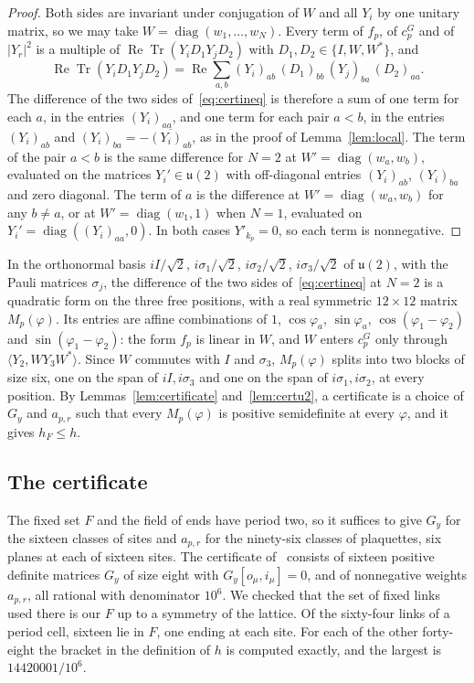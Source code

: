 \documentclass[aps,prd,twocolumn,superscriptaddress,nofootinbib,longbibliography,floatfix,amsmath,amssymb,10pt]{revtex4-2}
\theoremstyle{definition}
\theoremstyle{remark}
\newcommand{\ReTr}{\operatorname{Re}\operatorname{Tr}}
\newcommand{\ip}[2]{\langle #1,#2\rangle}
\begin{document}
\begin{proof}
Both sides are invariant under conjugation of $W$ and all $Y_i$ by one
unitary matrix, so we may take $W=\operatorname{diag}(w_1,\dots,w_N)$. Every
term of $f_p$, of $c^G_p$ and of $|Y_r|^2$ is a multiple of
$\ReTr(Y_iD_1Y_jD_2)$ with $D_1,D_2\in\{I,W,W^*\}$, and
\[
\ReTr(Y_iD_1Y_jD_2)=\operatorname{Re}\sum_{a,b}(Y_i)_{ab}\,(D_1)_{bb}\,
(Y_j)_{ba}\,(D_2)_{aa}.
\]
The difference of the two sides of~\eqref{eq:certineq} is therefore a sum
of one term for each $a$, in the entries $(Y_i)_{aa}$, and one term for
each pair $a<b$, in the entries $(Y_i)_{ab}$ and $(Y_i)_{ba}=
-\overline{(Y_i)_{ab}}$, as in the proof of Lemma~\ref{lem:local}. The term
of the pair $a<b$ is the same difference for $N=2$ at
$W'=\operatorname{diag}(w_a,w_b)$, evaluated on the matrices $Y_i'\in
\mathfrak u(2)$ with off-diagonal entries $(Y_i)_{ab}$, $(Y_i)_{ba}$ and
zero diagonal. The term of $a$ is the difference at $W'=\operatorname{diag}(w_a,w_b)$ for any $b\ne a$, or at $W'=\operatorname{diag}(w_1,1)$ when $N=1$,
evaluated on $Y_i'=\operatorname{diag}((Y_i)_{aa},0)$. In both cases
$Y'_{k_p}=0$, so each term is nonnegative.
\end{proof}

In the orthonormal basis $iI/\sqrt2$, $i\sigma_1/\sqrt2$,
$i\sigma_2/\sqrt2$, $i\sigma_3/\sqrt2$ of $\mathfrak u(2)$, with the Pauli
matrices $\sigma_j$, the difference of the two sides
of~\eqref{eq:certineq} at $N=2$ is a quadratic form on the three free
positions, with a real symmetric $12\times12$ matrix $M_p(\varphi)$. Its
entries are affine combinations of $1$, $\cos\varphi_a$, $\sin\varphi_a$,
$\cos(\varphi_1-\varphi_2)$ and $\sin(\varphi_1-\varphi_2)$: the form $f_p$
is linear in $W$, and $W$ enters $c^G_p$ only through
$\ip{Y_2}{WY_3W^*}$. Since $W$ commutes with $I$ and $\sigma_3$,
$M_p(\varphi)$ splits into two blocks of size six, one on the span of
$iI,i\sigma_3$ and one on the span of $i\sigma_1,i\sigma_2$, at every
position. By Lemmas~\ref{lem:certificate} and~\ref{lem:certu2}, a
certificate is a choice of $G_y$ and $a_{p,r}$ such that every
$M_p(\varphi)$ is positive semidefinite at every $\varphi$, and it gives
$h_F\le h$.

\subsection{The certificate}

The fixed set $F$ and the field of ends have period two, so it suffices to
give $G_y$ for the sixteen classes of sites and $a_{p,r}$ for the
ninety-six classes of plaquettes, six planes at each of sixteen sites. The
certificate of~\cite{Rom26} consists of sixteen positive definite matrices
$G_y$ of size eight with $G_y[o_\mu,i_\mu]=0$, and of nonnegative weights
$a_{p,r}$, all rational with denominator $10^6$. We checked that the set of fixed
links used there is our $F$ up to a symmetry of the lattice. Of the sixty-four links of
a period cell, sixteen lie in $F$, one ending at each site. For each of
the other forty-eight the bracket in the definition of $h$ is computed
exactly, and the largest is $14420001/10^6$.
\end{document}

